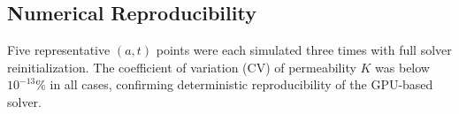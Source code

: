 \subsection{Numerical Reproducibility}\label{sec:reproducibility}

Five representative $(a, t)$ points were each simulated three times
with full solver reinitialization.  The coefficient of variation (CV)
of permeability $K$ was below $10^{-13}\%$ in all cases,
confirming deterministic reproducibility of the GPU-based solver.
